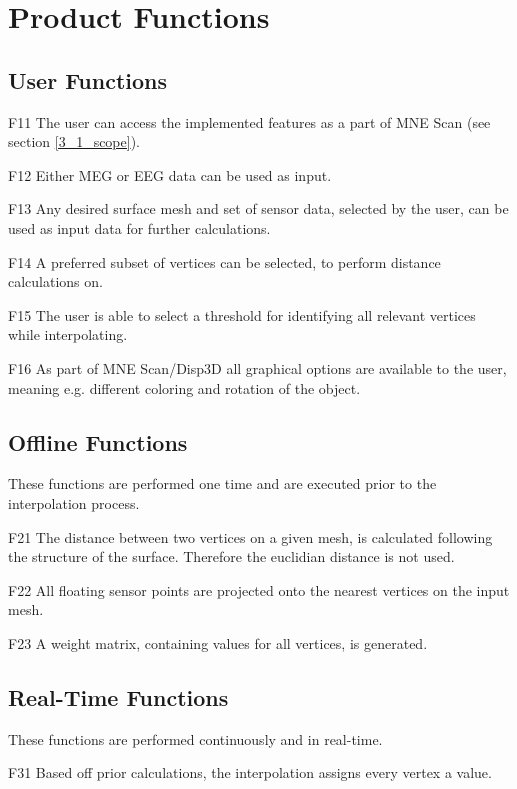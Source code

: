\section{Product Functions}

\subsection{User Functions}

	\begin{aims}
	
		\item[F11] The user can access the implemented features as a part of MNE Scan (see section \ref{3_1_scope}).
		\item[F12] Either MEG or EEG data can be used as input.
		\item[F13] Any desired surface mesh and set of sensor data, selected by the user, can be used as input data for 							further calculations.
		\item[F14] A preferred subset of vertices can be selected, to perform distance calculations on. 
		\item[F15] The user is able to select a threshold for identifying all relevant vertices while interpolating. 
		\item[F16] As part of MNE Scan/Disp3D all graphical options are available to the user, meaning e.g. different 								coloring and rotation of the object.
	
	\end{aims}

\subsection{Offline Functions}
	
	These functions are performed one time and are executed prior to the interpolation process.	
	
	\begin{aims}
	
		\item[F21]	The distance between two vertices on a given mesh, is calculated following the structure of the surface. 						Therefore the euclidian distance is not used.
		\item[F22] All floating sensor points are projected onto the nearest vertices on the input mesh. 
		\item[F23] A weight matrix, containing values for all vertices, is generated. 
 	
	\end{aims}
	
\subsection{Real-Time Functions}

	These functions are performed continuously and in real-time.	
	
	\begin{aims}
	
		\item[F31]	Based off prior calculations, the interpolation assigns every vertex a value.
	
	\end{aims}